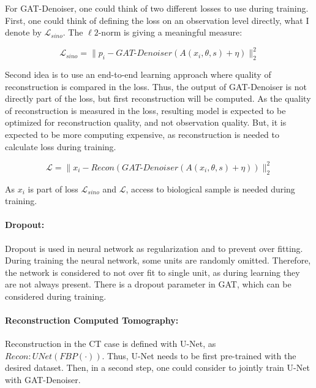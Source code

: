 For GAT-Denoiser, one could think of two different losses to use during training.
First, one could think of defining the loss on an observation level directly, 
what I denote by $\mathcal{L}_{sino}$. The $\ell2$-norm is giving a meaningful measure:

\begin{equation}
  \label{eq:loss_sino}
  \mathcal{L}_{sino} = \parallel p_i - \textit{GAT-Denoiser}(A(x_i, \theta, s) + \eta) \parallel ^2_2
\end{equation}

Second idea is to use an end-to-end learning approach where quality of reconstruction is 
compared in the loss. Thus, the output of GAT-Denoiser is not directly part of the loss, but first reconstruction will be computed.
As the quality of reconstruction is measured in the loss, resulting model is expected to be optimized
for reconstruction quality, and not observation quality. But, it is expected to be more computing expensive,
as reconstruction is needed to calculate loss during training.

\begin{equation}
  \label{eq:loss_reco}
  \mathcal{L} = \parallel x_i - \textit{Recon} ( \textit{GAT-Denoiser}(A(x_i, \theta, s) + \eta)) \parallel ^2_2
\end{equation}


As $x_i$ is part of loss $\mathcal{L}_{sino}$ and $\mathcal{L}$, access to biological sample is needed during training.

\paragraph{Dropout:}
Dropout is used in neural network as regularization and to prevent over fitting. 
During training the neural network, some units are randomly omitted. Therefore, the network is 
considered to not over fit to single unit, as during learning they are not always present.
There is a dropout parameter in GAT, which can be considered during training. 


\paragraph{Reconstruction Computed Tomography:}
Reconstruction in the CT case is defined with U-Net, as $\textit{Recon} : \textit{UNet} \left( \textit{FBP} \left( \cdot \right) \right)$.
Thus, U-Net needs to be first pre-trained with the desired dataset.
Then, in a second step, one could consider to jointly train U-Net with GAT-Denoiser.